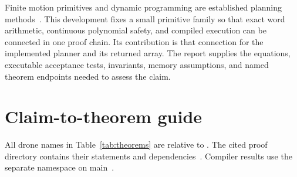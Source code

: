 \documentclass[11pt]{article}
\begin{document}
Finite motion primitives and dynamic programming are established planning methods~\cite{lavalle}.  This development fixes a small primitive family so that exact word arithmetic, continuous polynomial safety, and compiled execution can be connected in one proof chain.  Its contribution is that connection for the implemented planner and its returned array.  The report supplies the equations, executable acceptance tests, invariants, memory assumptions, and named theorem endpoints needed to assess the claim.

\appendix
\section{Claim-to-theorem guide}

All drone names in Table~\ref{tab:theorems} are relative to .  The cited proof directory contains their statements and dependencies~\cite{drone-proofs}.  Compiler results use the separate  namespace on main~\cite{compiler-source}.
\end{document}

